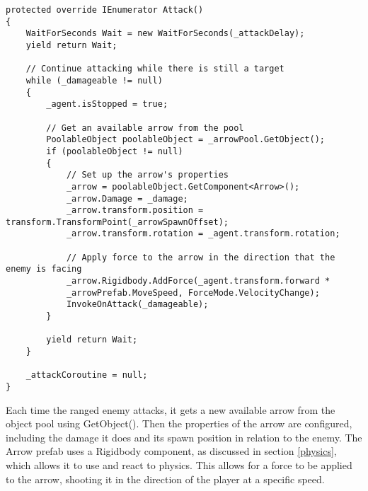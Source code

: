 \documentclass[10pt]{final_report}
\begin{document}
\begin{verbatim}
protected override IEnumerator Attack()
{
    WaitForSeconds Wait = new WaitForSeconds(_attackDelay);
    yield return Wait;

    // Continue attacking while there is still a target
    while (_damageable != null)
    {
        _agent.isStopped = true;

        // Get an available arrow from the pool
        PoolableObject poolableObject = _arrowPool.GetObject();
        if (poolableObject != null)
        {
            // Set up the arrow's properties
            _arrow = poolableObject.GetComponent<Arrow>();
            _arrow.Damage = _damage;
            _arrow.transform.position = transform.TransformPoint(_arrowSpawnOffset);
            _arrow.transform.rotation = _agent.transform.rotation;

            // Apply force to the arrow in the direction that the enemy is facing
            _arrow.Rigidbody.AddForce(_agent.transform.forward * 
			_arrowPrefab.MoveSpeed, ForceMode.VelocityChange);
            InvokeOnAttack(_damageable);
        }
            
        yield return Wait;
    }

    _attackCoroutine = null;
}
\end{verbatim}
Each time the ranged enemy attacks, it gets a new available arrow from the object pool using GetObject(). Then the properties of the arrow are configured, including the damage it does and its spawn position in relation to the enemy. The Arrow prefab uses a Rigidbody component, as discussed in section \ref{physics}, which allows it to use and react to physics. This allows for a force to be applied to the arrow, shooting it in the direction of the player at a specific speed. 

\end{document}
